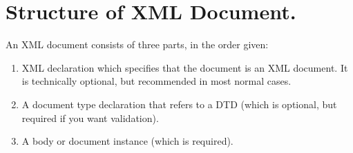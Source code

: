 \section{Structure of XML Document.}
An XML document consists of three parts, in the order given:
\begin{enumerate}
	\item XML declaration which specifies that the document is an XML document. It is technically optional, but recommended in most normal cases.
	\item A document type declaration that refers to a DTD (which is optional, but required if you want validation).
	\item A body or document instance (which is required).
\end{enumerate}

